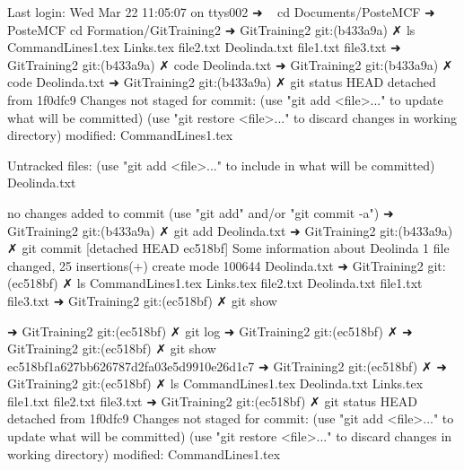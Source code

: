 Last login: Wed Mar 22 11:05:07 on ttys002
➜  ~ cd Documents/PosteMCF 
➜  PosteMCF cd Formation/GitTraining2 
➜  GitTraining2 git:(b433a9a) ✗ ls
CommandLines1.tex Links.tex         file2.txt
Deolinda.txt      file1.txt         file3.txt
➜  GitTraining2 git:(b433a9a) ✗ code Deolinda.txt 
➜  GitTraining2 git:(b433a9a) ✗ code Deolinda.txt
➜  GitTraining2 git:(b433a9a) ✗ git status
HEAD detached from 1f0dfc9
Changes not staged for commit:
  (use "git add <file>..." to update what will be committed)
  (use "git restore <file>..." to discard changes in working directory)
	modified:   CommandLines1.tex

Untracked files:
  (use "git add <file>..." to include in what will be committed)
	Deolinda.txt

no changes added to commit (use "git add" and/or "git commit -a")
➜  GitTraining2 git:(b433a9a) ✗ git add Deolinda.txt                     
➜  GitTraining2 git:(b433a9a) ✗ git commit
[detached HEAD ec518bf] Some information about Deolinda
 1 file changed, 25 insertions(+)
 create mode 100644 Deolinda.txt
➜  GitTraining2 git:(ec518bf) ✗ ls           
CommandLines1.tex Links.tex         file2.txt
Deolinda.txt      file1.txt         file3.txt
➜  GitTraining2 git:(ec518bf) ✗ git show














➜  GitTraining2 git:(ec518bf) ✗ git log
➜  GitTraining2 git:(ec518bf) ✗ 
➜  GitTraining2 git:(ec518bf) ✗ git show ec518bf1a627bb626787d2fa03e5d9910e26d1c7
➜  GitTraining2 git:(ec518bf) ✗ 
➜  GitTraining2 git:(ec518bf) ✗ ls
CommandLines1.tex Deolinda.txt      Links.tex         file1.txt         file2.txt         file3.txt
➜  GitTraining2 git:(ec518bf) ✗ git status
HEAD detached from 1f0dfc9
Changes not staged for commit:
  (use "git add <file>..." to update what will be committed)
  (use "git restore <file>..." to discard changes in working directory)
	modified:   CommandLines1.tex

